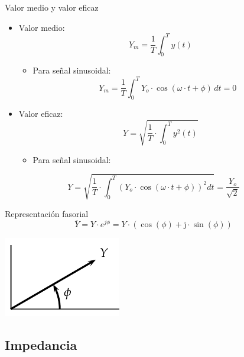 \documentclass[xcolor={usenames,svgnames,dvipsnames}]{beamer}
\begin{document}
\begin{frame}[label={sec:org6535e13}]{Valor medio y valor eficaz}
\begin{itemize}
\item \alert{Valor medio}: $$Y_m=\frac{1}{T}\int_{0}^{T}y(t)$$

\begin{itemize}
\item Para señal sinusoidal:
$$Y_m=\frac{1}{T}\int_{0}^{T}Y_{o}\cdot\cos(\omega\cdot
            t+\phi)\, dt=0$$
\end{itemize}

\item \alert{Valor eficaz}:
$$Y = \sqrt{\frac{1}{T}\cdot\int_{0}^{T}y^{2}(t)}$$

\begin{itemize}
\item Para señal sinusoidal:
\end{itemize}
\end{itemize}

$$Y=\sqrt{\frac{1}{T}\cdot\int_{0}^{T}\left(Y_{o}\cdot\cos(\omega\cdot
      t+\phi)\right)^{2}dt}=\frac{Y_{o}}{\sqrt{2}}$$
\end{frame}

\begin{frame}[label={sec:orgdedbcc4}]{Representación fasorial}
$$\overline{Y}=Y\cdot e^{j\phi}=Y\cdot(\cos(\phi)+\mathrm{j}\cdot\sin(\phi))$$

\begin{center}
\includegraphics[width=.9\linewidth]{../figs/Fasor.pdf}
\end{center}
\end{frame}

\subsection{Impedancia}
\label{sec:org2add6b5}
\end{document}
